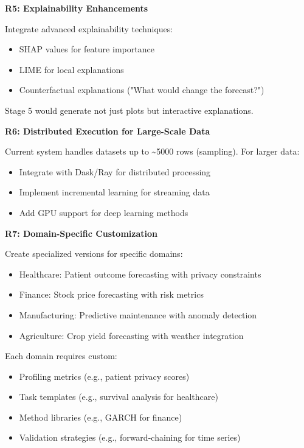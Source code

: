 \documentclass[11pt,a4paper]{article}
\begin{document}
\textbf{R5: Explainability Enhancements}

Integrate advanced explainability techniques:
\begin{itemize}
    \item SHAP values for feature importance
    \item LIME for local explanations
    \item Counterfactual explanations ("What would change the forecast?")
\end{itemize}

Stage 5 would generate not just plots but interactive explanations.

\textbf{R6: Distributed Execution for Large-Scale Data}

Current system handles datasets up to \~{}5000 rows (sampling). For larger data:
\begin{itemize}
    \item Integrate with Dask/Ray for distributed processing
    \item Implement incremental learning for streaming data
    \item Add GPU support for deep learning methods
\end{itemize}

\textbf{R7: Domain-Specific Customization}

Create specialized versions for specific domains:
\begin{itemize}
    \item Healthcare: Patient outcome forecasting with privacy constraints
    \item Finance: Stock price forecasting with risk metrics
    \item Manufacturing: Predictive maintenance with anomaly detection
    \item Agriculture: Crop yield forecasting with weather integration
\end{itemize}

Each domain requires custom:
\begin{itemize}
    \item Profiling metrics (e.g., patient privacy scores)
    \item Task templates (e.g., survival analysis for healthcare)
    \item Method libraries (e.g., GARCH for finance)
    \item Validation strategies (e.g., forward-chaining for time series)
\end{itemize}
\end{document}
